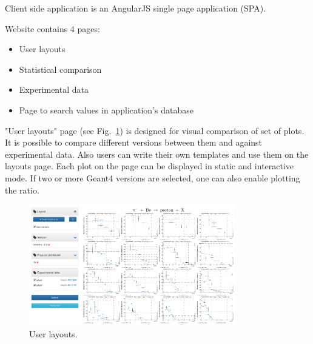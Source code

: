 Client side application is an AngularJS single page application (SPA). 


Website contains 4 pages:

\begin{itemize}
    \item User layouts
    \item Statistical comparison
    \item Experimental data
    \item Page to search values in application's database
\end{itemize}

"User layouts" page (see Fig.~\ref{fig:layouts}) is designed for visual comparison of set of plots. It is possible to compare different versions between them and against experimental data. Also users can write their own templates and use them on the layouts page. Each plot on the page can be displayed in static and interactive mode. If two or more Geant4 versions are selected, one can also enable plotting the ratio.

\begin{figure}[h]
    \centering
    \includegraphics[width=0.8\textwidth,clip]{layouts.png}
    \caption{User layouts.}
    \label{fig:layouts}
\end{figure}

